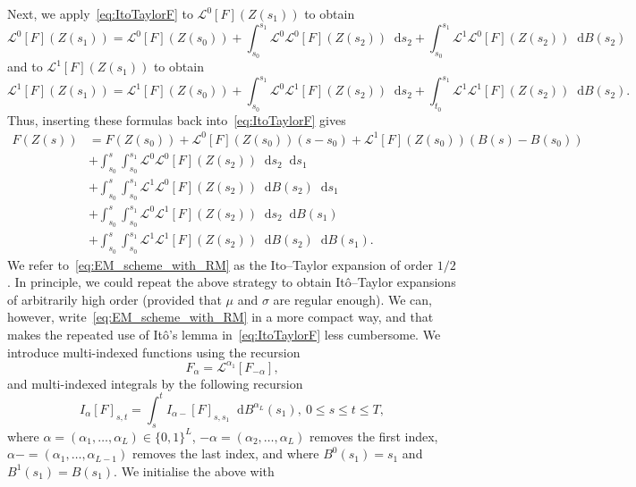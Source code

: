 \documentclass[11pt]{amsart}
\newcommand*\diff{\mathop{}\!\mathrm{d}}
\newcommand{\Lo}{\mathcal{L}^{0}}
\newcommand{\Li}{\mathcal{L}^{1}}
\newcommand{\LL}{\mathcal{L}}
\begin{document}
{Next, we apply~\eqref{eq:ItoTaylorF} to $\Lo[F](Z(s_{1}))$  to obtain
\begin{equation*}
\Lo[F](Z(s_{1})) = \Lo[F](Z(s_{0})) + \int_{s_{0}}^{s_{1}} \Lo \Lo[F](Z(s_{2})) \diff s_{2} + \int_{s_{0}}^{s_{1}} \Li \Lo[F](Z(s_{2})) \diff B(s_{2})
\end{equation*}
and to $\Li[F](Z(s_{1}))$ to obtain
\begin{equation*}
\Li[F](Z(s_{1})) = \Li[F](Z(s_{0})) + \int_{s_{0}}^{s_{1}} \Lo \Li[F](Z(s_{2})) \diff s_{2} + \int_{t_{0}}^{s_{1}} \Li \Li[F](Z(s_{2})) \diff B(s_{2}).
\end{equation*}
Thus, inserting these formulas back into~\eqref{eq:ItoTaylorF} gives
\begin{equation}\label{eq:EM_scheme_with_RM}
  \begin{split}
    F(Z(s)) &= F(Z(s_{0})) + \Lo[F](Z(s_{0})) (s - s_{0}) + \Li[F](Z(s_{0})) (B(s)-B(s_{0})) \\ &+ \int_{s_{0}}^{s} \int_{s_{0}}^{s_{1}} \Lo \Lo[F](Z(s_{2})) \diff s_{2} \diff s_{1} \\ & + \int_{s_{0}}^{s} \int_{s_{0}}^{s_{1}} \Li \Lo[F](Z(s_{2})) \diff B(s_{2}) \diff s_{1} \\ &+ \int_{s_{0}}^{s} \int_{s_{0}}^{s_{1}} \Lo \Li[F](Z(s_{2})) \diff s_{2} \diff B(s_{1}) \\ & + \int_{s_{0}}^{s} \int_{s_{0}}^{s_{1}} \Li \Li[F](Z(s_{2})) \diff B(s_{2}) \diff B(s_{1}).
  \end{split}
\end{equation}
We refer to~\eqref{eq:EM_scheme_with_RM} as the Ito--Taylor expansion of order $1/2$. In principle, we could repeat the above strategy to obtain Itô--Taylor expansions of arbitrarily high order (provided that $\mu$ and $\sigma$ are regular enough). We can, however, write~\eqref{eq:EM_scheme_with_RM} in a more compact way, and that makes the repeated use of Itô's lemma in~\eqref{eq:ItoTaylorF} less cumbersome. We introduce multi-indexed functions using the recursion
\begin{equation}\label{eq:DefMultIndCoefFunc}
F_{\alpha} = \LL^{\alpha_{1}} [F_{-\alpha}],
\end{equation}
and multi-indexed integrals by the following recursion
\begin{equation}\label{eq:DefMultIndInt}
I_{\alpha}[F]_{s,t} = \int_{s}^{t}  I_{\alpha-}[F]_{s,s_{1}} \diff B^{\alpha_{L}}(s_{1}),\ 0 \leq s \leq t \leq T,
\end{equation}
where $\alpha = (\alpha_{1},\ldots,\alpha_{L}) \in \{ 0,1 \}^{L}$, $-\alpha = (\alpha_{2},\ldots,\alpha_{L})$ removes the first index, $\alpha- = (\alpha_{1},\ldots,\alpha_{L-1})$ removes the last index, and where $B^{0}(s_{1}) = s_{1}$ and $B^{1}(s_{1}) = B(s_{1})$. We initialise the above with
}
\end{document}
